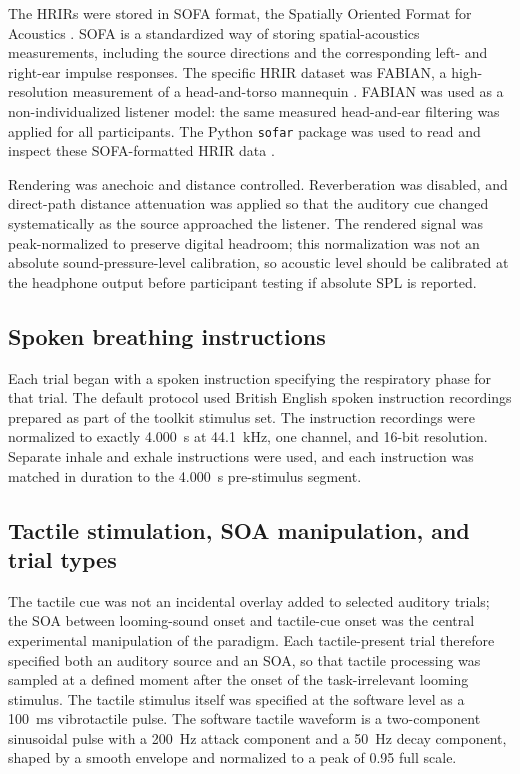 The HRIRs were stored in SOFA format, the Spatially Oriented Format for
Acoustics \citep{Majdak2022SOFA}. SOFA is a standardized way of storing
spatial-acoustics measurements, including the source directions and the
corresponding left- and right-ear impulse responses. The specific HRIR dataset
was FABIAN, a high-resolution measurement of a head-and-torso mannequin
\citep{Brinkmann2017FABIAN}. FABIAN was used as a non-individualized listener
model: the same measured head-and-ear filtering was applied for all
participants. The Python \texttt{sofar} package was used to read and inspect
these SOFA-formatted HRIR data \citep{Sofar2026}.

Rendering was anechoic and distance controlled. Reverberation was disabled, and
direct-path distance attenuation was applied so that the auditory cue changed
systematically as the source approached the listener. The rendered signal was
peak-normalized to preserve digital headroom; this normalization was not an
absolute sound-pressure-level calibration, so acoustic level should be
calibrated at the headphone output before participant testing if absolute SPL
is reported.

\subsection{Spoken breathing instructions}

Each trial began with a spoken instruction specifying the respiratory phase for
that trial. The default protocol used British English spoken instruction
recordings prepared as part of the toolkit stimulus set. The instruction
recordings were normalized to exactly 4.000~s at 44.1~kHz, one channel, and
16-bit resolution. Separate inhale and exhale instructions were used, and each
instruction was matched in duration to the 4.000~s pre-stimulus segment.

\subsection{Tactile stimulation, SOA manipulation, and trial types}

The tactile cue was not an incidental overlay added to selected auditory trials;
the SOA between looming-sound onset and tactile-cue onset was the central
experimental manipulation of the paradigm. Each tactile-present trial therefore
specified both an auditory source and an SOA, so that tactile processing was
sampled at a defined moment after the onset of the task-irrelevant looming
stimulus. The tactile stimulus itself was specified at the software level as a
100~ms vibrotactile pulse. The software tactile waveform is a two-component
sinusoidal pulse with a 200~Hz attack component and a 50~Hz decay component,
shaped by a smooth envelope and normalized to a peak of 0.95 full scale.

